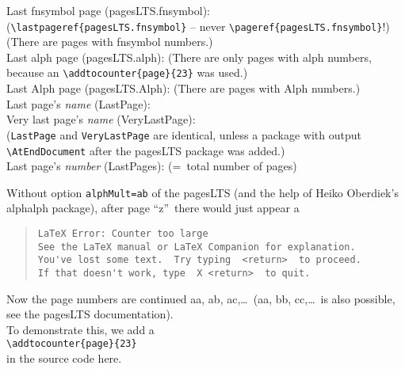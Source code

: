 \documentclass[british]{article}
\def\pagesLTSexamplealph{23}
\begin{document}
\noindent Last fnsymbol page (pagesLTS.fnsymbol):  \\
(\texttt{\textbackslash lastpageref\{pagesLTS.fnsymbol\}} -- never
\texttt{\textbackslash pageref\{pagesLTS.fnsymbol\}}!)\\
(There are  pages with fnsymbol numbers.)\\

\noindent Last alph page (pagesLTS.alph): 
(There are only  pages with alph numbers,
because an \texttt{\textbackslash addtocounter\{page\}\{\pagesLTSexamplealph\}} was used.)\\

\noindent Last Alph page (pagesLTS.Alph): 
(There are  pages with Alph numbers.)\\

\noindent Last page's \textit{name} (LastPage): \\

\noindent Very last page's \textit{name} (VeryLastPage): \\
(\texttt{LastPage} and \texttt{VeryLastPage} are identical, unless
a package with output \linebreak
\texttt{\textbackslash AtEndDocument} after the \textsf{pagesLTS} package
was added.)\\

\noindent Last page's \textit{number} (LastPages): 
(=~total number of pages)\\

\lipsum[1-4]

\newpage

Without option \texttt{alphMult=ab} of the \textsf{pagesLTS} (and the help of
Heiko Oberdiek's \textsf{alphalph} package), after page
\textquotedblleft z\textquotedblright\ there would just appear a
\begin{quote}
\begin{verbatim}
LaTeX Error: Counter too large
See the LaTeX manual or LaTeX Companion for explanation.
You've lost some text.  Try typing  <return>  to proceed.
If that doesn't work, type  X <return>  to quit.
\end{verbatim}
\end{quote}
Now the page numbers are continued aa, ab, ac,\ldots\ (aa, bb, cc,\ldots\ is
also possible, see the \textsf{pagesLTS} documentation).\\
To demonstrate this, we add a\\
\texttt{\textbackslash addtocounter\{page\}\{\pagesLTSexamplealph\}}\\
in the source code here.
\end{document}
